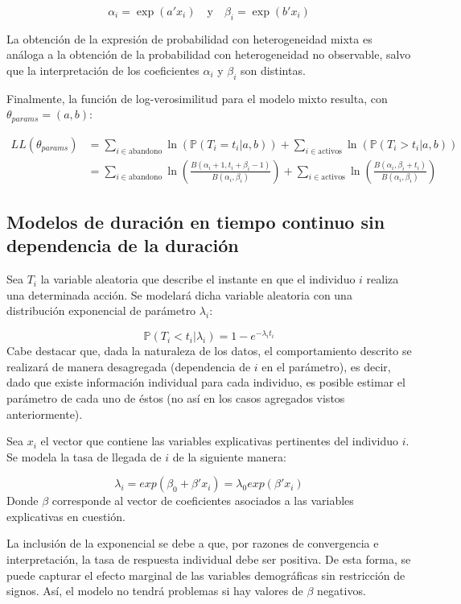 \documentclass[
]{book}
\begin{document}
\[\alpha_i = \exp(a'x_i) \quad \text{y} \quad \beta_i = \exp(b'x_i)\]

La obtención de la expresión de probabilidad con heterogeneidad mixta es
análoga a la obtención de la probabilidad con heterogeneidad no
observable, salvo que la interpretación de los coeficientes \(\alpha_i\) y
\(\beta_i\) son distintas.

Finalmente, la función de log-verosimilitud para el modelo mixto
resulta, con \(\theta_{params} = (a, b)\):

\[
\begin{aligned}
LL(\theta_{params}) &= \sum_{i \in \text{abandono}} \ln(\mathbb{P}(T_i = t_i|a, b)) + \sum_{i \in \text{activos}} \ln(\mathbb{P}(T_i > t_i|a, b)) \\
&= \sum_{i \in \text{abandono}} \ln\left(\frac{B(\alpha_i+1, t_i+\beta_i-1)}{B(\alpha_i, \beta_i)}\right) + \sum_{i \in \text{activos}} \ln\left(\frac{B(\alpha_i, \beta_i+t_i)}{B(\alpha_i, \beta_i)}\right)
\end{aligned}
\]

\subsection{Modelos de duración en tiempo continuo sin dependencia de la duración}\label{modelos-de-duraciuxf3n-en-tiempo-continuo-sin-dependencia-de-la-duraciuxf3n}

Sea \(T_i\) la variable aleatoria que describe el instante en que el
individuo \(i\) realiza una determinada acción. Se modelará dicha variable
aleatoria con una distribución exponencial de parámetro \(\lambda_i\):

\[\mathbb{P}(T_i<t_i|\lambda_i) = 1-e^{-\lambda_it_i}\]Cabe destacar
que, dada la naturaleza de los datos, el comportamiento descrito se
realizará de manera desagregada (dependencia de \(i\) en el parámetro), es
decir, dado que existe información individual para cada individuo, es
posible estimar el parámetro de cada uno de éstos (no así en los casos
agregados vistos anteriormente).

Sea \(x_i\) el vector que contiene las variables explicativas pertinentes
del individuo \(i\). Se modela la tasa de llegada de \(i\) de la siguiente
manera:

\[\lambda_i = exp(\beta_0 + \beta'x_i) = \lambda_0 exp(\beta'x_i)\]
Donde \(\beta\) corresponde al vector de coeficientes asociados a las
variables explicativas en cuestión.

La inclusión de la exponencial se debe a que, por razones de
convergencia e interpretación, la tasa de respuesta individual debe ser
positiva. De esta forma, se puede capturar el efecto marginal de las
variables demográficas sin restricción de signos. Así, el modelo no
tendrá problemas si hay valores de \(\beta\) negativos.
\end{document}
